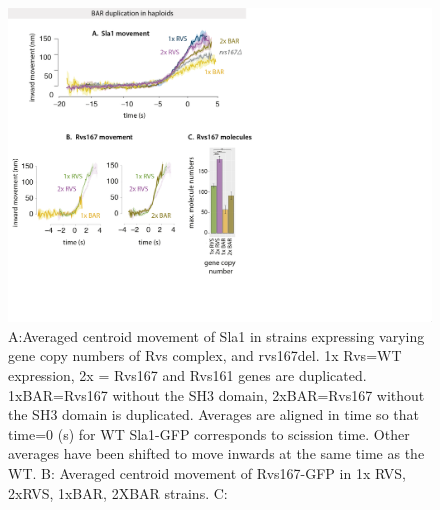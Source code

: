 	\begin{figure}
	\centering
	\includegraphics[width=23cm,height=23 cm,keepaspectratio]{figures/results_final/scaffolding_overlaid2}
	\caption [Progression of invagination with increasing BAR recruitment]
	{A:Averaged centroid movement of Sla1 in strains expressing varying gene copy numbers of Rvs complex, and rvs167del. 1x Rvs=WT expression, 2x = Rvs167 and Rvs161 genes are duplicated. 1xBAR=Rvs167 without the SH3 domain, 2xBAR=Rvs167 without the SH3 domain is duplicated. Averages are aligned in time so that time=0 (s) for WT Sla1-GFP corresponds to scission time. Other averages have been shifted to move inwards at the same time as the WT.
	B: Averaged centroid movement of Rvs167-GFP in 1x RVS, 2xRVS, 1xBAR, 2XBAR strains.
	C:  }
	\end{figure}


